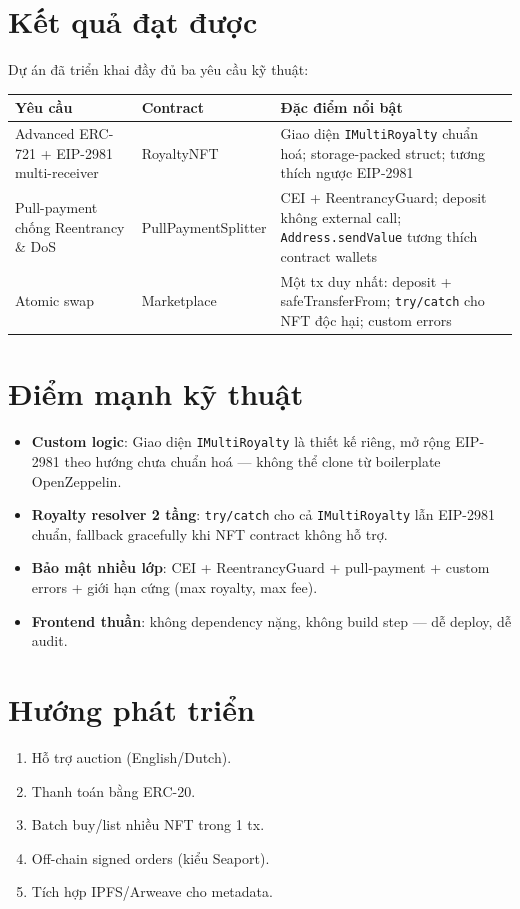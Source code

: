 \documentclass[12pt,a4paper,oneside]{report}
\theoremstyle{plain}
\theoremstyle{definition}
\theoremstyle{remark}
\begin{document}
\section{Kết quả đạt được}

Dự án đã triển khai đầy đủ ba yêu cầu kỹ thuật:

\begin{table}[H]
\centering\small
\begin{tabularx}{\textwidth}{p{4cm} l X}
\toprule
\textbf{Yêu cầu} & \textbf{Contract} & \textbf{Đặc điểm nổi bật} \\
\midrule
Advanced ERC-721 + EIP-2981 multi-receiver & RoyaltyNFT & Giao diện \texttt{IMultiRoyalty} chuẩn hoá; storage-packed struct; tương thích ngược EIP-2981 \\
Pull-payment chống Reentrancy \& DoS & PullPaymentSplitter & CEI + ReentrancyGuard; deposit không external call; \texttt{Address.sendValue} tương thích contract wallets \\
Atomic swap & Marketplace & Một tx duy nhất: deposit + safeTransferFrom; \texttt{try/catch} cho NFT độc hại; custom errors \\
\bottomrule
\end{tabularx}
\end{table}

\section{Điểm mạnh kỹ thuật}
\begin{itemize}
  \item \textbf{Custom logic}: Giao diện \texttt{IMultiRoyalty} là thiết kế riêng, mở rộng EIP-2981
        theo hướng chưa chuẩn hoá — không thể clone từ boilerplate OpenZeppelin.
  \item \textbf{Royalty resolver 2 tầng}: \texttt{try/catch} cho cả \texttt{IMultiRoyalty} lẫn
        EIP-2981 chuẩn, fallback gracefully khi NFT contract không hỗ trợ.
  \item \textbf{Bảo mật nhiều lớp}: CEI + ReentrancyGuard + pull-payment + custom errors +
        giới hạn cứng (max royalty, max fee).
  \item \textbf{Frontend thuần}: không dependency nặng, không build step — dễ deploy, dễ audit.
\end{itemize}

\section{Hướng phát triển}
\begin{enumerate}
  \item Hỗ trợ auction (English/Dutch).
  \item Thanh toán bằng ERC-20.
  \item Batch buy/list nhiều NFT trong 1 tx.
  \item Off-chain signed orders (kiểu Seaport).
  \item Tích hợp IPFS/Arweave cho metadata.
\end{enumerate}
\end{document}

